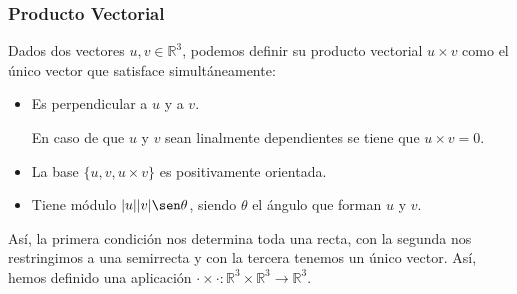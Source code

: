 \subsubsection{Producto Vectorial}
\noindent
Dados dos vectores $u,v\in \mathbb{R}^3$, podemos definir su producto vectorial $u\times v$ como el único vector que satisface simultáneamente:
\begin{itemize}
    \item Es perpendicular a $u$ y a $v$.

        En caso de que $u$ y $v$ sean linalmente dependientes se tiene que $u\times v = 0$.
    \item La base $\{u,v,u\times v\}$ es positivamente orientada.
    \item Tiene módulo $|u||v|\sen\theta$, siendo $\theta$ el ángulo que forman $u$ y $v$.
\end{itemize}
Así, la primera condición nos determina toda una recta, con la segunda nos restringimos a una semirrecta y con la tercera tenemos un único vector. Así, hemos definido una aplicación $\cdot \times\cdot :\mathbb{R}^3\times\mathbb{R}^3\to\mathbb{R}^3$.\\

